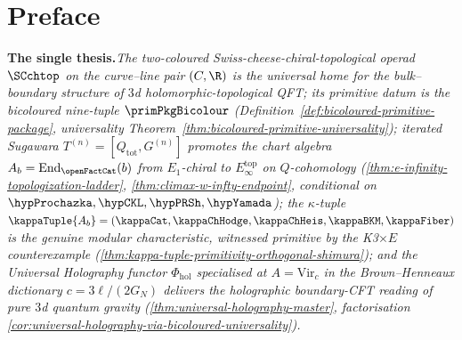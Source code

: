 \providecommand{\cL}{\mathscr{L}}
\providecommand{\Steinb}{\mathfrak{S}}
\providecommand{\cZ}{\mathcal{Z}}
\providecommand{\cH}{\mathcal{H}}
\providecommand{\fg}{\mathfrak{g}}
\providecommand{\cW}{\mathcal{W}}
\providecommand{\gSC}{\mathfrak{g}^{\mathrm{SC}}}
\providecommand{\gAmod}{\mathfrak{g}^{\mathrm{mod}}_\cA}
\providecommand{\Ydg}{Y^{\mathrm{dg}}}
\providecommand{\Zder}{\operatorname{Z}_{\mathrm{der}}}
\providecommand{\Abulk}{A_{\mathrm{bulk}}}
\providecommand{\Bbound}{B_{\partial}}
\providecommand{\mc}{\operatorname{MC}}
\providecommand{\Res}{\operatorname{Res}}
\providecommand{\RHom}{\operatorname{RHom}}
\providecommand{\PhiFA}{\Phi^{\mathrm{FA}}}
\providecommand{\SpCh}{\mathrm{Sp}_{\mathrm{Ch}}}
\providecommand{\HolFA}{\mathrm{HolFA}}
\providecommand{\EdHolFA}{E_d\text{-}\HolFA}
\providecommand{\EnHolFA}{E_n\text{-}\HolFA}
\providecommand{\intSigma}{\textstyle\int_{\Sigma}}
\providecommand{\hCS}{\mathrm{hCS}}
\providecommand{\Phihol}{\Phi_{\mathrm{hol}}}

\chapter*{Preface}

\vspace{1em}

\noindent
\textbf{The single thesis.}\quad\emph{The two-coloured
Swiss-cheese-chiral-topological operad $\SCchtop$ on the
curve--line pair $(C, \R)$ is the universal home for the
bulk--boundary structure of $3$d holomorphic-topological QFT;
its primitive datum is the bicoloured nine-tuple
$\primPkgBicolour$
\textup(Definition~\ref{def:bicoloured-primitive-package},
universality
Theorem~\ref{thm:bicoloured-primitive-universality}\textup);
iterated Sugawara
$T^{(n)} = [Q_{\mathrm{tot}}, G^{(n)}]$ promotes the chart algebra
$A_b = \mathrm{End}_{\openFactCat}(b)$ from $E_1$-chiral to
$E_\infty^{\mathrm{top}}$ on $Q$-cohomology
\textup(\cref{thm:e-infinity-topologization-ladder},
\cref{thm:climax-w-infty-endpoint},
conditional on
$\hypProchazka, \hypCKL, \hypPRSh, \hypYamada$\textup{)}; the
$\kappa$-tuple
$\kappaTuple{A_b} =
(\kappaCat, \kappaChHodge, \kappaChHeis, \kappaBKM, \kappaFiber)$
is the genuine modular characteristic, witnessed primitive by
the K3$\times E$ counterexample
\textup(\cref{thm:kappa-tuple-primitivity-orthogonal-shimura}\textup);
and the Universal Holography functor $\Phihol$ specialised at
$A = \mathrm{Vir}_c$ in the Brown--Henneaux dictionary
$c = 3 \ell / (2 G_N)$ delivers the holographic boundary-CFT
reading of pure $3$d quantum gravity
\textup(\cref{thm:universal-holography-master},
factorisation
\cref{cor:universal-holography-via-bicoloured-universality}\textup).}


